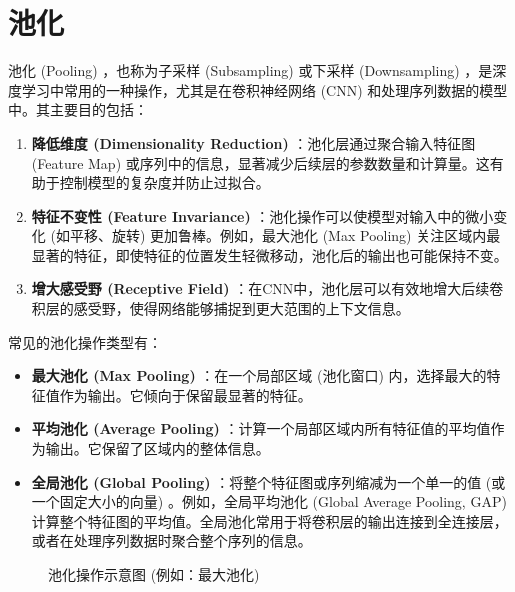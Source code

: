 
\chapter{池化}

池化 (Pooling) ，也称为子采样 (Subsampling) 或下采样 (Downsampling) ，是深度学习中常用的一种操作，尤其是在卷积神经网络 (CNN) 和处理序列数据的模型中。其主要目的包括：

\begin{enumerate}
    \item \textbf{降低维度 (Dimensionality Reduction) }：池化层通过聚合输入特征图 (Feature Map) 或序列中的信息，显著减少后续层的参数数量和计算量。这有助于控制模型的复杂度并防止过拟合。
    \item \textbf{特征不变性 (Feature Invariance) }：池化操作可以使模型对输入中的微小变化 (如平移、旋转) 更加鲁棒。例如，最大池化 (Max Pooling) 关注区域内最显著的特征，即使特征的位置发生轻微移动，池化后的输出也可能保持不变。
    \item \textbf{增大感受野 (Receptive Field) }：在CNN中，池化层可以有效地增大后续卷积层的感受野，使得网络能够捕捉到更大范围的上下文信息。
\end{enumerate}

常见的池化操作类型有：
\begin{itemize}
    \item \textbf{最大池化 (Max Pooling) }：在一个局部区域 (池化窗口) 内，选择最大的特征值作为输出。它倾向于保留最显著的特征。
    \item \textbf{平均池化 (Average Pooling) }：计算一个局部区域内所有特征值的平均值作为输出。它保留了区域内的整体信息。
    \item \textbf{全局池化 (Global Pooling) }：将整个特征图或序列缩减为一个单一的值 (或一个固定大小的向量) 。例如，全局平均池化 (Global Average Pooling, GAP) 计算整个特征图的平均值。全局池化常用于将卷积层的输出连接到全连接层，或者在处理序列数据时聚合整个序列的信息。
\end{itemize}

\begin{figure}[h]
    \centering
    \caption{池化操作示意图 (例如：最大池化)}
    \label{fig:pooling_example}
\end{figure}

